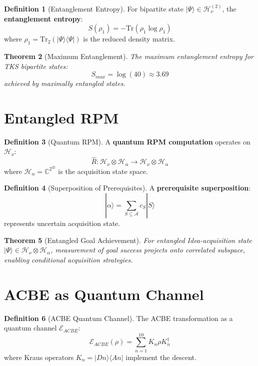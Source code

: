 \documentclass[11pt,twoside,openright]{book}
\theoremstyle{definition}
\newtheorem{definition}{Definition}[chapter]
\theoremstyle{plain}
\newtheorem{theorem}[definition]{Theorem}
\theoremstyle{remark}
\newcommand{\Acquisitions}{\mathcal{A}}
\newcommand{\Hspace}{\mathcal{H}}
\newcommand{\qket}[1]{|#1\rangle}
\newcommand{\qbra}[1]{\langle #1|}
\newcommand{\qop}[1]{\hat{#1}}
\newcommand{\Trace}{\mathrm{Tr}}             %
\begin{document}
\begin{definition}[Entanglement Entropy]
\label{def:entanglement-entropy}
For bipartite state $\qket{\Psi} \in \Hspace_\nu^{(2)}$, the \textbf{entanglement entropy}:
\[
S(\rho_1) = -\Trace(\rho_1 \log \rho_1)
\]
where $\rho_1 = \Trace_2(\qket{\Psi}\qbra{\Psi})$ is the reduced density matrix.
\end{definition}

\begin{theorem}[Maximum Entanglement]
\label{thm:max-entanglement}
The maximum entanglement entropy for TKS bipartite states:
\[
S_{max} = \log(40) \approx 3.69
\]
achieved by maximally entangled states.
\end{theorem}

\section{Entangled RPM}

\begin{definition}[Quantum RPM]
\label{def:quantum-rpm}
A \textbf{quantum RPM computation} operates on $\Hspace_\nu$:
\[
\qop{R} : \Hspace_\nu \otimes \Hspace_\alpha \to \Hspace_\nu \otimes \Hspace_\alpha
\]
where $\Hspace_\alpha = \mathbb{C}^{2^{22}}$ is the acquisition state space.
\end{definition}

\begin{definition}[Superposition of Prerequisites]
\label{def:superposition-prereq}
A \textbf{prerequisite superposition}:
\[
\qket{\alpha} = \sum_{S \subseteq \Acquisitions} c_S \qket{S}
\]
represents uncertain acquisition state.
\end{definition}

\begin{theorem}[Entangled Goal Achievement]
\label{thm:entangled-goal}
For entangled Idea-acquisition state $\qket{\Psi} \in \Hspace_\nu \otimes \Hspace_\alpha$, measurement of goal success projects onto correlated subspace, enabling conditional acquisition strategies.
\end{theorem}

\section{ACBE as Quantum Channel}

\begin{definition}[ACBE Quantum Channel]
\label{def:acbe-channel}
The ACBE transformation as a quantum channel $\mathcal{E}_{ACBE}$:
\[
\mathcal{E}_{ACBE}(\rho) = \sum_{n=1}^{10} K_n \rho K_n^\dagger
\]
where Kraus operators $K_n = \qket{Dn}\qbra{An}$ implement the descent.
\end{definition}
\end{document}
